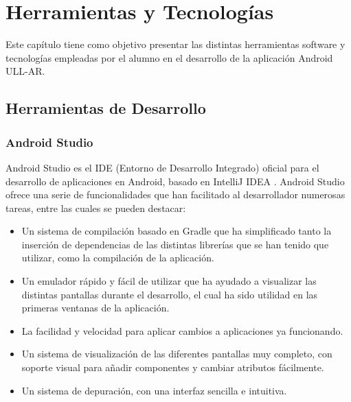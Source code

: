 %
%
%


\cleardoublepage
\chapter{Herramientas y Tecnologías} \label{chap:Tecnologias} 

Este capítulo tiene como objetivo presentar las distintas herramientas software y tecnologías empleadas por el alumno en el desarrollo de la aplicación Android ULL-AR.

\section{Herramientas de Desarrollo}

\subsection{Android Studio}

Android Studio \cite{URL::AndroidStudio} es el IDE  \cite{URL::IDE} (Entorno de Desarrollo Integrado) oficial para el desarrollo de aplicaciones en Android, basado en IntelliJ IDEA \cite{URL::IntelliJIDEA}. Android Studio ofrece una serie de funcionalidades que han facilitado al desarrollador numerosas tareas, entre las cuales se pueden destacar:

\begin{itemize}
\item Un sistema de compilación basado en Gradle \cite{URL::Gradle} que ha simplificado tanto la inserción de dependencias de las distintas librerías que se han tenido que utilizar, como la compilación de la aplicación.
\item Un emulador rápido y fácil de utilizar que ha ayudado a visualizar las distintas pantallas durante el desarrollo, el cual ha sido utilidad en las primeras ventanas de la aplicación.
\item La facilidad y velocidad para aplicar cambios a aplicaciones ya funcionando. 
\item Un sistema de visualización de las diferentes pantallas muy completo, con soporte visual para añadir componentes y cambiar atributos fácilmente.
\item Un sistema de depuración, con una interfaz sencilla e intuitiva.
\end{itemize} 

